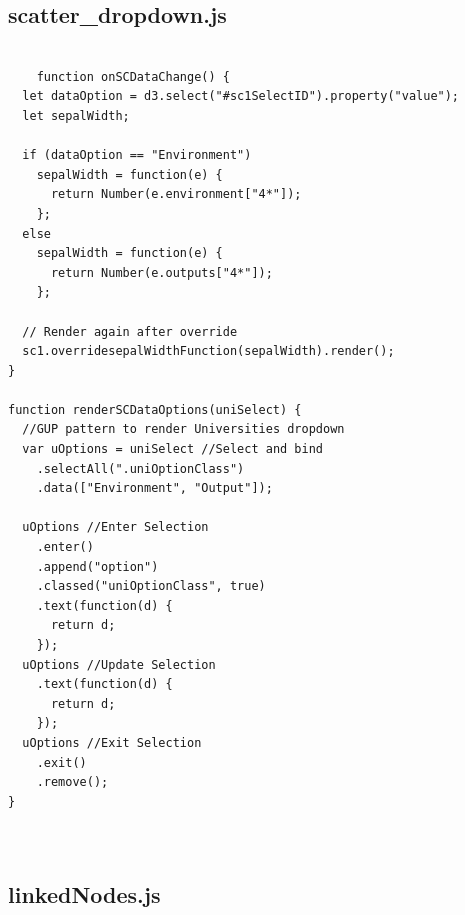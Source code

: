 \documentclass[a4paper, 11pt]{article}
\begin{document}
\newpage
\subsection{scatter\_dropdown.js}

\begin{verbatim}
    
    function onSCDataChange() {
  let dataOption = d3.select("#sc1SelectID").property("value");
  let sepalWidth;

  if (dataOption == "Environment")
    sepalWidth = function(e) {
      return Number(e.environment["4*"]);
    };
  else
    sepalWidth = function(e) {
      return Number(e.outputs["4*"]);
    };

  // Render again after override
  sc1.overridesepalWidthFunction(sepalWidth).render();
}

function renderSCDataOptions(uniSelect) {
  //GUP pattern to render Universities dropdown
  var uOptions = uniSelect //Select and bind
    .selectAll(".uniOptionClass")
    .data(["Environment", "Output"]);

  uOptions //Enter Selection
    .enter()
    .append("option")
    .classed("uniOptionClass", true)
    .text(function(d) {
      return d;
    });
  uOptions //Update Selection
    .text(function(d) {
      return d;
    });
  uOptions //Exit Selection
    .exit()
    .remove();
}

    
\end{verbatim}


\newpage
\subsection{linkedNodes.js}
\end{document}
